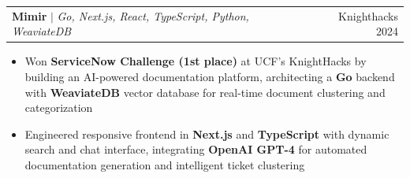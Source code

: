 \documentclass[letterpaper,11pt]{article}
\makeatletter
\newcommand{\resumeItem}[1]{
  \item\small{
    {#1 \vspace{-2pt}}
  }
}
\newcommand{\resumeProjectHeading}[2]{
    \item
    \begin{tabular*}{0.97\textwidth}{l@{\extracolsep{\fill}}r}
      \small#1 & #2 \\
    \end{tabular*}\vspace{-7pt}
}
\newcommand{\resumeItemListStart}{\begin{itemize}}
\newcommand{\resumeItemListEnd}{\end{itemize}\vspace{-5pt}}
\makeatother
\begin{document}
\resumeProjectHeading
{{\href{https://devpost.com/software/mimir-lwui28}{\faLink}}
\textbf{Mimir} $|$ \emph{Go, Next.js, React, TypeScript, Python, WeaviateDB}} {Knighthacks 2024}
\resumeItemListStart
  \resumeItem{Won \textbf{ServiceNow Challenge (1st place)} at UCF's KnightHacks by building an AI-powered documentation platform, architecting a \textbf{Go} backend with \textbf{WeaviateDB} vector database for real-time document clustering and categorization}
  \resumeItem{Engineered responsive frontend in \textbf{Next.js} and \textbf{TypeScript} with dynamic search and chat interface, integrating \textbf{OpenAI GPT-4} for automated documentation generation and intelligent ticket clustering}
\resumeItemListEnd



\end{document}
